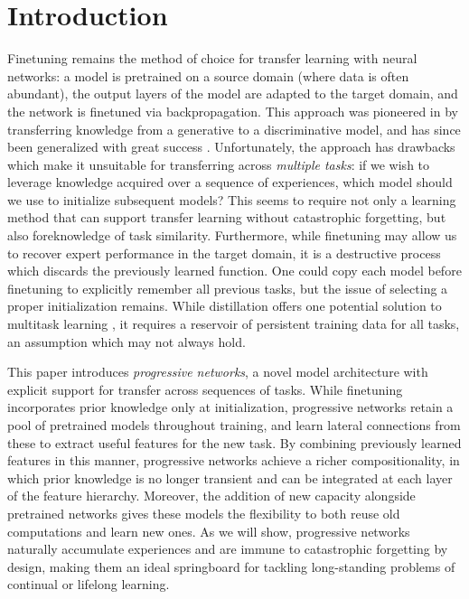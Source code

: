 \section{Introduction}

Finetuning remains the method of choice for transfer learning with neural
networks: a model is pretrained on a source domain (where data is often
abundant), the output layers of the model are adapted to the target domain, and the
network is finetuned via backpropagation. This approach was
pioneered in \cite{hinton2006science} by transferring knowledge from a
generative to a discriminative model, and has since been generalized
with great success \cite{UTLC+LISA-2011}.  Unfortunately, the approach has drawbacks
which make it unsuitable for transferring across \textit{multiple tasks}: if we
wish to leverage knowledge acquired over a sequence of experiences, which model
should we use to initialize subsequent models? This seems to require not only a
learning method that can support transfer learning without catastrophic forgetting, but also
foreknowledge of task similarity. Furthermore, while finetuning may allow us to
recover expert performance in the target domain, it is a destructive process
which discards the previously learned function. One could copy each model before
finetuning to explicitly remember all previous tasks, but the issue of
selecting a proper initialization remains.  While distillation
\cite{Hinton2015distil} offers one potential solution to multitask learning
\cite{Rusu15}, it requires a reservoir of persistent training data for all tasks,
an assumption which may not always hold.

This paper introduces \textit{progressive networks}, a novel model architecture
with explicit support for transfer across sequences of tasks. While finetuning
incorporates prior knowledge only at initialization, progressive networks
retain a pool of pretrained models throughout training, and learn lateral connections
from these to extract useful features for the new task.  By combining previously
learned features in this
manner, progressive networks achieve a richer compositionality, in which prior
knowledge is no longer transient and can be integrated at each layer of the
feature hierarchy. Moreover, the addition of new capacity alongside pretrained
networks gives these models the flexibility to both reuse old computations and learn new ones.
As we will show, progressive networks naturally accumulate experiences and
are immune to catastrophic forgetting by design, making them an ideal
springboard for tackling long-standing problems of continual or lifelong
learning.

